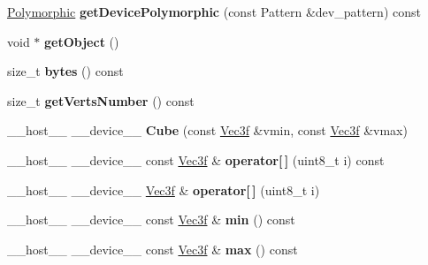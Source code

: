 \begin{DoxyCompactItemize}
\item 
\hyperlink{struct_polymorphic}{Polymorphic} {\bfseries get\+Device\+Polymorphic} (const Pattern \&dev\+\_\+pattern) const\hypertarget{class_cube_a91b7f2d2323140cfedbd92c61b636e56}{}\label{class_cube_a91b7f2d2323140cfedbd92c61b636e56}

\item 
void $\ast$ {\bfseries get\+Object} ()\hypertarget{class_cube_a9e68554bff4a2880f2ec981d2f8cb61a}{}\label{class_cube_a9e68554bff4a2880f2ec981d2f8cb61a}

\item 
size\+\_\+t {\bfseries bytes} () const\hypertarget{class_cube_a6dd4277f8d5956f74d73bb1ef988ae3a}{}\label{class_cube_a6dd4277f8d5956f74d73bb1ef988ae3a}

\item 
size\+\_\+t {\bfseries get\+Verts\+Number} () const\hypertarget{class_cube_a5cc25a88ab64cccb175db6f91241d92e}{}\label{class_cube_a5cc25a88ab64cccb175db6f91241d92e}

\item 
\+\_\+\+\_\+host\+\_\+\+\_\+ \+\_\+\+\_\+device\+\_\+\+\_\+ {\bfseries Cube} (const \hyperlink{class_vec3}{Vec3f} \&vmin, const \hyperlink{class_vec3}{Vec3f} \&vmax)\hypertarget{class_cube_a2ddff6f7a6270913135aaf3631d5c47f}{}\label{class_cube_a2ddff6f7a6270913135aaf3631d5c47f}

\item 
\+\_\+\+\_\+host\+\_\+\+\_\+ \+\_\+\+\_\+device\+\_\+\+\_\+ const \hyperlink{class_vec3}{Vec3f} \& {\bfseries operator\mbox{[}$\,$\mbox{]}} (uint8\+\_\+t i) const\hypertarget{class_cube_af8b0f76d2d1776fb9de4df6b7ee6a3ad}{}\label{class_cube_af8b0f76d2d1776fb9de4df6b7ee6a3ad}

\item 
\+\_\+\+\_\+host\+\_\+\+\_\+ \+\_\+\+\_\+device\+\_\+\+\_\+ \hyperlink{class_vec3}{Vec3f} \& {\bfseries operator\mbox{[}$\,$\mbox{]}} (uint8\+\_\+t i)\hypertarget{class_cube_a461bb6acf329d5863890be583c8f1ddc}{}\label{class_cube_a461bb6acf329d5863890be583c8f1ddc}

\item 
\+\_\+\+\_\+host\+\_\+\+\_\+ \+\_\+\+\_\+device\+\_\+\+\_\+ const \hyperlink{class_vec3}{Vec3f} \& {\bfseries min} () const\hypertarget{class_cube_aa9fbc346ac23564a2aba2ee5baed7f17}{}\label{class_cube_aa9fbc346ac23564a2aba2ee5baed7f17}

\item 
\+\_\+\+\_\+host\+\_\+\+\_\+ \+\_\+\+\_\+device\+\_\+\+\_\+ const \hyperlink{class_vec3}{Vec3f} \& {\bfseries max} () const\hypertarget{class_cube_a6169e4698259d8fcd5fc0825bca81359}{}\label{class_cube_a6169e4698259d8fcd5fc0825bca81359}


\end{DoxyCompactItemize}
